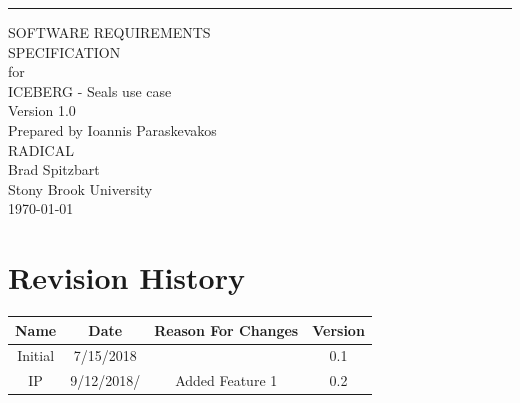 \documentclass{scrreprt}
\date{}
\title{}
\def\myversion{1.0 }
\begin{document}
\begin{flushright}
    \rule{16cm}{5pt}\vskip1cm
    \begin{bfseries}
        \Huge{SOFTWARE REQUIREMENTS\\ SPECIFICATION}\\
        \vspace{1.9cm}
        for\\
        \vspace{1.9cm}
        ICEBERG - Seals use case\\
        \vspace{1.9cm}
        \LARGE{Version \myversion}\\
        \vspace{1.9cm}
        Prepared by Ioannis Paraskevakos\\
        RADICAL\\
	Brad Spitzbart\\
        Stony Brook University\\
        \vspace{1.9cm}
        \today\\
    \end{bfseries}
\end{flushright}

\tableofcontents


\chapter*{Revision History}

\begin{center}
    \begin{tabular}{|c|c|c|c|}
        \hline
        Name & Date & Reason For Changes & Version\\\hline
        Initial & 7/15/2018 & & 0.1\\\hline
        IP & 9/12/2018/ & Added Feature 1 & 0.2\\\hline
    \end{tabular}
\end{center}


\end{document}
